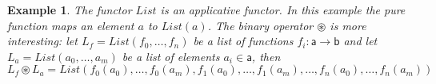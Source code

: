 \documentclass{article}
\newcommand{\ob}[1]{\mathsf{#1}} %
\newtheorem{example}[theorem]{Example}
\begin{document}
\begin{example}
	The functor $List$ is an applicative functor.
	In this example the pure function maps an element $a$ to $List(a)$. The binary operator $\circledast$ is more interesting:
	let $L_f = List(f_0, \dots, f_n)$ be a list of functions $f_i: \ob{a} \rightarrow \ob{b}$ and let $L_a = List(a_0, \dots, a_m)$ be a list of elements $a_i \in \ob{a}$, then
	$$L_f \circledast L_a = List(f_0(a_0), \dots, f_0(a_m), f_1(a_0), \dots, f_1(a_m), \dots, f_n(a_0), \dots, f_n(a_m))$$
\end{example}
\end{document}
